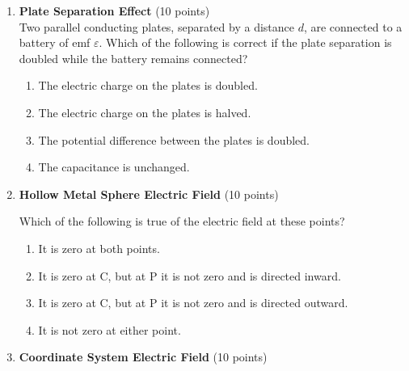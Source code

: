 \begin{enumerate}
  \item \textbf{Plate Separation Effect} (10 points)\\
  Two parallel conducting plates, separated by a distance $d$, are connected to a battery of emf $\varepsilon$. Which of the following is correct if the plate separation is doubled while the battery remains connected?
  \begin{enumerate}[label=(\Alph*)]
    \item The electric charge on the plates is doubled.
    \item The electric charge on the plates is halved.
    \item The potential difference between the plates is doubled.
    \item The capacitance is unchanged.
  \end{enumerate}
  \begin{subanswer}
  \end{subanswer}

  \item \textbf{Hollow Metal Sphere Electric Field} (10 points)\\
  
  Which of the following is true of the electric field at these points?
  \begin{enumerate}[label=(\Alph*)]
    \item It is zero at both points.
    \item It is zero at C, but at P it is not zero and is directed inward.
    \item It is zero at C, but at P it is not zero and is directed outward.
    \item It is not zero at either point.
  \end{enumerate}
  \begin{subanswer}
  \end{subanswer}

  \item \textbf{Coordinate System Electric Field} (10 points)\\
  

\end{enumerate}
